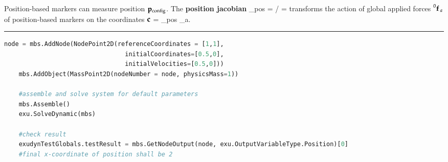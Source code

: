     Position-based markers can measure position $\mathbf{p}_\mathrm{config}$. The {\bf position jacobian}  
    \be
      \Jm_{pos} = \partial \pv\cCur / \partial \cv\cCur = 
    \ee
    transforms the action of global applied forces $\prescript{0}{}{\mathbf{f}}\,_a$ of position-based markers on the coordinates $\mathbf{c}$
    \be
      \Qm = \Jm_{pos} _a.
    \ee
\vspace{6pt}\par\noindent\rule{\textwidth}{0.4pt}
\label{miniExample_ObjectMassPoint2D}
\pythonstyle
\begin{lstlisting}[language=Python, firstnumber=1]
    node = mbs.AddNode(NodePoint2D(referenceCoordinates = [1,1], 
                                 initialCoordinates=[0.5,0],
                                 initialVelocities=[0.5,0]))
    mbs.AddObject(MassPoint2D(nodeNumber = node, physicsMass=1))

    #assemble and solve system for default parameters
    mbs.Assemble()
    exu.SolveDynamic(mbs)

    #check result
    exudynTestGlobals.testResult = mbs.GetNodeOutput(node, exu.OutputVariableType.Position)[0]
    #final x-coordinate of position shall be 2

\end{lstlisting}

